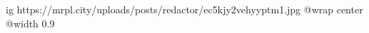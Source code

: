  
 
 
 
 

\ifcmt
  ig https://mrpl.city/uploads/posts/redactor/ec5kjy2vehyyptm1.jpg
  @wrap center
  @width 0.9
\fi
